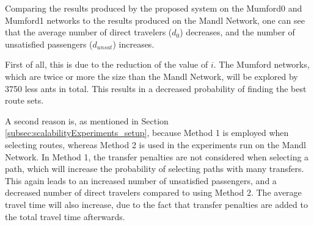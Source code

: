 Comparing the results produced by the proposed system on the Mumford0 and Mumford1 networks to the results produced on the Mandl Network, one can see that the average number of direct travelers ($d_0$) decreases, and the number of unsatisfied passengers ($d_{unsat}$) increases. 

First of all, this is due to the reduction of the value of $i$. The Mumford networks, which are twice or more the size than the Mandl Network, will be explored by 3750 less ants in total. This results in a decreased probability of finding the best route sets. 

A second reason is, as mentioned in Section \vref{subsec:scalabilityExperiments_setup}, because Method 1 is employed when selecting routes, whereas Method 2 is used in the experiments run on the Mandl Network. In Method 1, the transfer penalties are not considered when selecting a path, which will increase the probability of selecting paths with many transfers. This again leads to an increased number of unsatisfied passengers, and a decreased number of direct travelers compared to using Method 2. The average travel time will also increase, due to the fact that transfer penalties are added to the total travel time afterwards.  


